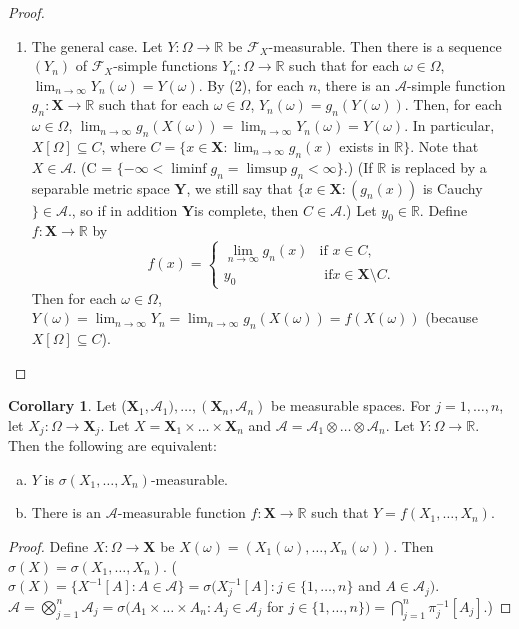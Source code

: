 \documentclass{article}
\newcommand{\R}{\mathbb{R}}
\newcommand{\F}{\mathscr{F}}
\theoremstyle{definition}
\newtheorem{corollary}[theorem]{Corollary}
\begin{document}
\begin{proof}
\begin{enumerate}[(1)]
        \item The general case. Let $Y : \Omega \to \R$ be $\F_X$-measurable. Then there is a sequence $(Y_n)$ of $\F_X$-simple functions $Y_n : \Omega \to \R$ such that for each $\omega \in \Omega$, $\lim_{n\to\infty} Y_n(\omega) = Y(\omega)$. By (2), for each $n$, there is an $\mathscr{A}$-simple function $g_n : \mathbf{X} \to \R$ such that for each $\omega \in \Omega$, $Y_n(\omega) = g_n(Y(\omega))$. Then, for each $\omega \in \Omega$, $\lim_{n\to\infty} g_n(X(\omega)) = \lim_{n \to \infty} Y_n(\omega) = Y(\omega)$. In particular, $X[\Omega] \subseteq C$, where $C = \{x \in \mathbf{X} : \lim_{n\to\infty} g_n(x)$ exists in $\R\}$. Note that $X \in \mathscr{A}$. (C = $\{-\infty < \liminf g_n = \limsup g_n < \infty\}$.) (If $\R$ is replaced by a separable metric space $\mathbf{Y}$, we still say that $\{x \in \mathbf{X} : (g_n(x))$ is Cauchy $\} \in \mathscr{A}$., so if in addition $\mathbf{Y}$is complete, then $C \in \mathscr{A}$.) Let $y_0 \in \R$. Define $f : \mathbf{X} \to \R$ by
        \[
            f(x) = \begin{cases}
                \lim_{n\to\infty} g_n(x) & \text{if } x \in C, \\
                y_0 & \text{ if} x \in \mathbf{X} \setminus C.
            \end{cases}
        \]
        Then for each $\omega \in \Omega$, $Y(\omega) = \lim_{n\to\infty} Y_n = \lim_{n\to\infty} g_n(X(\omega)) = f(X(\omega))$ (because $X[\Omega] \subseteq C$).
    \end{enumerate}
\end{proof}

\begin{corollary}
    Let ($\mathbf{X}_1,\mathscr{A}_1), \dots, (\mathbf{X}_n, \mathscr{A}_n)$ be measurable spaces. For $j = 1, \dots, n$, let $X_j : \Omega \to \mathbf{X}_j$. Let $X = \mathbf{X}_1 \times \dots \times \mathbf{X}_n$ and $\mathscr{A} = \mathscr{A}_1 \otimes \dots \otimes \mathscr{A}_n$. Let $Y : \Omega \to \R$. Then the following are equivalent:
    \begin{enumerate}[(a)]
        \item $Y$ is $\sigma(X_1, \dots, X_n)$-measurable.
        \item There is an $\mathscr{A}$-measurable function $f: \mathbf{X} \to \R$ such that $Y = f(X_1, \dots, X_n)$.
    \end{enumerate}
\end{corollary}
\begin{proof}
    Define $X : \Omega \to \mathbf{X}$ be $X(\omega) = (X_1(\omega), \dots, X_n(\omega))$. Then $\sigma(X) = \sigma(X_1, \dots, X_n)$. ($\sigma(X) = \{X^{-1}[A] : A \in \mathscr{A}\} = \sigma(X_j^{-1}[A] : j \in \{1, \dots, n\}$ and $A \in \mathscr{A}_j)$. $\mathscr{A} = \bigotimes_{j=1}^n \mathscr{A}_j = \sigma(A_1 \times \dots \times A_n : A_j \in \mathscr{A}_j$ for $j \in \{1, \dots, n\}) = \bigcap_{j=1}^n \pi_j^{-1}[A_j]$.)
\end{proof}
\end{document}
